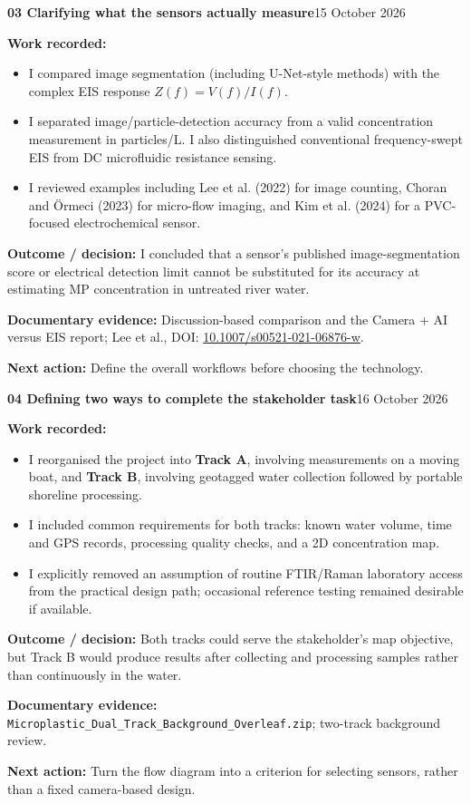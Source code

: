 \documentclass[11pt,a4paper]{article}
\newcommand{\logentry}[3]{%
  \Needspace{13\baselineskip}%
  \vspace{8pt}%
  {\large\bfseries\color{ink}#1 \quad #2}\hfill{\small\color{ink}#3}\par
  \vspace{-3pt}{\color{linecolor}\rule{\linewidth}{.6pt}}\par\vspace{1pt}%
}
\newcommand{\result}[1]{\textbf{Outcome / decision:} #1\par}
\newcommand{\evidence}[1]{\textbf{Documentary evidence:} {\small #1}\par}
\newcommand{\nextstep}[1]{\textbf{Next action:} #1\par}
\begin{document}
\logentry{03}{Clarifying what the sensors actually measure}{15 October 2026}
\textbf{Work recorded:}
\begin{itemize}
\item I compared image segmentation (including U-Net-style methods) with the complex EIS response $Z(f)=V(f)/I(f)$.
\item I separated image/particle-detection accuracy from a valid concentration measurement in particles/L. I also distinguished conventional frequency-swept EIS from DC microfluidic resistance sensing.
\item I reviewed examples including Lee et al. (2022) for image counting, Choran and \"Ormeci (2023) for micro-flow imaging, and Kim et al. (2024) for a PVC-focused electrochemical sensor.
\end{itemize}
\result{I concluded that a sensor's published image-segmentation score or electrical detection limit cannot be substituted for its accuracy at estimating MP concentration in untreated river water.}
\evidence{Discussion-based comparison and the Camera + AI versus EIS report; Lee et al., DOI: \href{https://doi.org/10.1007/s00521-021-06876-w}{10.1007/s00521-021-06876-w}.}
\nextstep{Define the overall workflows before choosing the technology.}

\logentry{04}{Defining two ways to complete the stakeholder task}{16 October 2026}
\textbf{Work recorded:}
\begin{itemize}
\item I reorganised the project into \textbf{Track A}, involving measurements on a moving boat, and \textbf{Track B}, involving geotagged water collection followed by portable shoreline processing.
\item I included common requirements for both tracks: known water volume, time and GPS records, processing quality checks, and a 2D concentration map.
\item I explicitly removed an assumption of routine FTIR/Raman laboratory access from the practical design path; occasional reference testing remained desirable if available.
\end{itemize}
\result{Both tracks could serve the stakeholder's map objective, but Track B would produce results after collecting and processing samples rather than continuously in the water.}
\evidence{\texttt{Microplastic\_Dual\_Track\_Background\_Overleaf.zip}; two-track background review.}
\nextstep{Turn the flow diagram into a criterion for selecting sensors, rather than a fixed camera-based design.}
\end{document}
